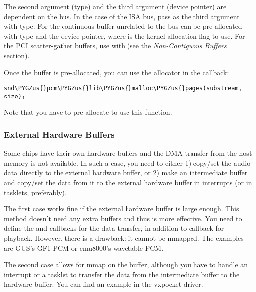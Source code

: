 \documentclass[a4paper,8pt,english]{sphinxmanual}
\def\PYGZus{\char`\_}
\begin{document}
The second argument (type) and the third argument (device pointer) are
dependent on the bus. In the case of the ISA bus, pass
 as the third argument with
 type. For the continuous buffer unrelated to the
bus can be pre-allocated with  type and the
 device pointer, where
 is the kernel allocation flag to use. For the PCI
scatter-gather buffers, use  with
 (see the {\hyperref[sound/kernel\string-api/writing\string-an\string-alsa\string-driver:non\string-contiguous\string-buffers]{\emph{Non-Contiguous Buffers}}}
section).

Once the buffer is pre-allocated, you can use the allocator in the
 callback:

\begin{Verbatim}[commandchars=\\\{\}]
snd\PYGZus{}pcm\PYGZus{}lib\PYGZus{}malloc\PYGZus{}pages(substream, size);
\end{Verbatim}

Note that you have to pre-allocate to use this function.


\subsubsection{External Hardware Buffers}
\label{sound/kernel-api/writing-an-alsa-driver:external-hardware-buffers}
Some chips have their own hardware buffers and the DMA transfer from the
host memory is not available. In such a case, you need to either 1)
copy/set the audio data directly to the external hardware buffer, or 2)
make an intermediate buffer and copy/set the data from it to the
external hardware buffer in interrupts (or in tasklets, preferably).

The first case works fine if the external hardware buffer is large
enough. This method doesn't need any extra buffers and thus is more
effective. You need to define the  and 
callbacks for the data transfer, in addition to 
callback for playback. However, there is a drawback: it cannot be
mmapped. The examples are GUS's GF1 PCM or emu8000's wavetable PCM.

The second case allows for mmap on the buffer, although you have to
handle an interrupt or a tasklet to transfer the data from the
intermediate buffer to the hardware buffer. You can find an example in
the vxpocket driver.
\end{document}
